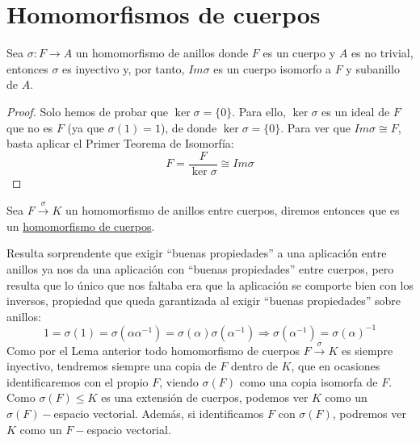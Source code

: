 \section{Homomorfismos de cuerpos}

\begin{lema}
    Sea $\sigma:F\to A$ un homomorfismo de anillos donde $F$ es un cuerpo y $A$ es no trivial, entonces $\sigma$ es inyectivo y, por tanto, $Im \sigma$ es un cuerpo isomorfo a $F$ y subanillo de $A$.
    \begin{proof}
        Solo hemos de probar que $\ker \sigma = \{0\}$. Para ello, $\ker \sigma$ es un ideal de $F$ que no es $F$ (ya que $\sigma(1) = 1$), de donde $\ker \sigma = \{0\}$. Para ver que $Im \sigma\cong F$, basta aplicar el Primer Teorema de Isomorfía:
        \begin{equation*}
            F = \dfrac{F}{\ker \sigma} \cong Im \sigma
        \end{equation*}
    \end{proof}
\end{lema}

\begin{definicion}
    Sea $F\stackrel{\sigma}{\to} K$ un homomorfismo de anillos entre cuerpos, diremos entonces que es un \underline{homomorfismo de cuerpos}.
\end{definicion}

\begin{observacion}
    Resulta sorprendente que exigir ``buenas propiedades'' a una aplicación entre anillos ya nos da una aplicación con ``buenas propiedades'' entre cuerpos, pero resulta que lo único que nos faltaba era que la aplicación se comporte bien con los inversos, propiedad que queda garantizada al exigir ``buenas propiedades'' sobre anillos:
    \begin{equation*}
        1 = \sigma(1) = \sigma\left(\alpha\alpha^{-1}\right) = \sigma(\alpha)\sigma\left(\alpha^{-1}\right) \Longrightarrow \sigma\left(\alpha^{-1}\right) = {\sigma(\alpha)}^{-1}
    \end{equation*}
    Como por el Lema anterior todo homomorfismo de cuerpos $F\stackrel{\sigma}{\to}K$ es siempre inyectivo, tendremos siempre una copia de $F$ dentro de $K$, que en ocasiones identificaremos con el propio $F$, viendo $\sigma(F)$ como una copia isomorfa de $F$. Como $\sigma(F)\leq K$ es una extensión de cuerpos, podemos ver $K$ como un $\sigma(F)-$espacio vectorial. Además, si identificamos $F$ con $\sigma(F)$, podremos ver $K$ como un $F-$espacio vectorial.
\end{observacion}

